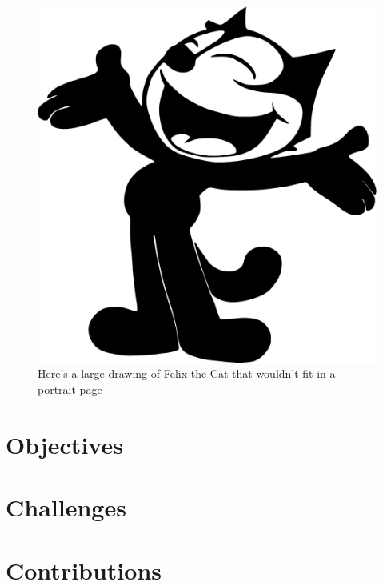 \begin{landscape}
	\begin{figure}[htbp]
\centering
\includegraphics[width=0.5\linewidth]{introduction/fig/Felix_the_cat.pdf}
\caption{Here's a large drawing of Felix the Cat that wouldn't fit in a portrait page}
\label{fig:felix2}
\end{figure}
\end{landscape}

\section{Objectives}
\section{Challenges}
\section{Contributions}